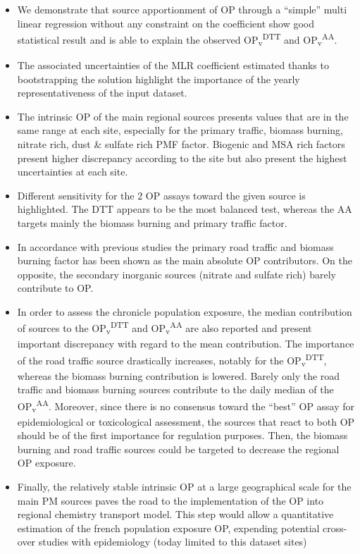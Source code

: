 \documentclass[acp]{copernicus}
\begin{document}
\begin{itemize}
\item
  We demonstrate that source apportionment of OP through a ``simple''
  multi linear regression without any constraint on the coefficient show
  good statistical result and is able to explain the observed
  OP\textsubscript{v}\textsuperscript{DTT} and
  OP\textsubscript{v}\textsuperscript{AA}.
\item
  The associated uncertainties of the MLR coefficient estimated thanks
  to bootstrapping the solution highlight the importance of the yearly
  representativeness of the input dataset.
\item
  The intrinsic OP of the main regional sources presents values that are
  in the same range at each site, especially for the primary traffic,
  biomass burning, nitrate rich, dust \& sulfate rich PMF factor.
  Biogenic and MSA rich factors present higher discrepancy according to
  the site but also present the highest uncertainties at each site.
\item
  Different sensitivity for the 2 OP assays toward the given source is
  highlighted. The DTT appears to be the most balanced test, whereas the
  AA targets mainly the biomass burning and primary traffic factor.
\item
  In accordance with previous studies the primary road traffic and
  biomass burning factor has been shown as the main absolute OP
  contributors. On the opposite, the secondary inorganic sources
  (nitrate and sulfate rich) barely contribute to OP.
\item
  In order to assess the chronicle population exposure, the median
  contribution of sources to the
  OP\textsubscript{v}\textsuperscript{DTT} and
  OP\textsubscript{v}\textsuperscript{AA} are also reported and present
  important discrepancy with regard to the mean contribution. The
  importance of the road traffic source drastically increases, notably
  for the OP\textsubscript{v}\textsuperscript{DTT}, whereas the biomass
  burning contribution is lowered. Barely only the road traffic and
  biomass burning sources contribute to the daily median of the
  OP\textsubscript{v}\textsuperscript{AA}. Moreover, since there is no
  consensus toward the ``best'' OP assay for epidemiological or
  toxicological assessment, the sources that react to both OP should be
  of the first importance for regulation purposes. Then, the biomass
  burning and road traffic sources could be targeted to decrease the
  regional OP exposure.
\item
  Finally, the relatively stable intrinsic OP at a large geographical
  scale for the main PM sources paves the road to the implementation of
  the OP into regional chemistry transport model. This step would allow
  a quantitative estimation of the french population exposure OP,
  expending potential cross-over studies with epidemiology (today
  limited to this dataset sites)
\end{itemize}
\end{document}
